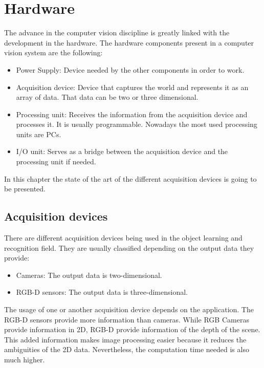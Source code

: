 \section{Hardware}
\label{hardware}
The advance in the computer vision discipline is greatly linked with the development in the hardware. 
The hardware components present in a computer vision system are the following: 

\begin{itemize}
	\item{Power Supply:} Device needed by the other components in order to work. 
	\item{Acquisition device:} Device that captures the world and represents it as an array of data. That data can be two or three dimensional. 
	\item{Processing unit:} Receives the information from the acquisition device and processes it. It is usually programmable. Nowadays the most used processing units are PCs. 
	\item{I/O unit:} Serves as a bridge between the acquisition device and the processing unit if needed. 

\end{itemize}

In this chapter the state of the art of the different acquisition devices is going to be presented. 

\subsection{Acquisition devices}
There are different acquisition devices being used in the object learning and recognition field. 
They are usually classified depending on the output data they provide: 

\begin{itemize}
	\item{Cameras:}	The output data is two-dimensional. 
	\item{RGB-D sensors:} The output data is three-dimensional. 
\end{itemize}

The usage of one or another acquisition device depends on the application. 
The RGB-D sensors provide more information than cameras. 
While RGB Cameras provide information in 2D, RGB-D provide information of the depth of the scene.
This added information makes image processing easier because it reduces the ambiguities of the 2D data. 
Nevertheless, the computation time needed is also much higher. 



